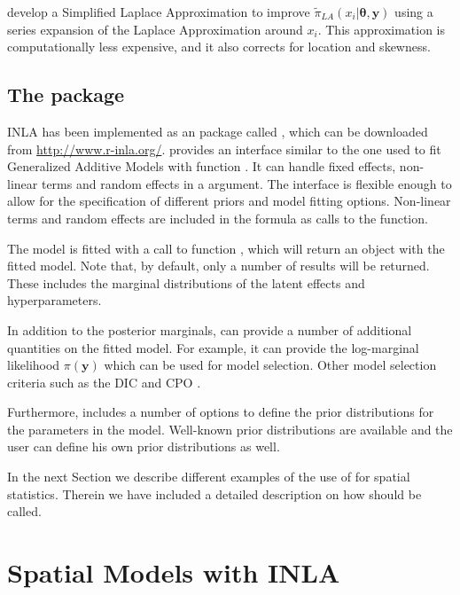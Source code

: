 \documentclass[article]{jss}
\begin{document}
\citet{isi:000264374200002} develop a Simplified Laplace Approximation to
improve $\tilde\pi_{LA}(x_i|\mathbf{\theta}, \mathbf{y})$ using a series
expansion of the Laplace Approximation around $x_i$. This approximation is
computationally less expensive, and it also corrects for location and
skewness.


\subsection[The R-INLA package]{The  package}

INLA has been implemented as an  package called ,
which can be downloaded from \url{http://www.r-inla.org/}. 
provides an interface similar to the one used to fit Generalized Additive
Models with function . It can handle fixed effects, non-linear terms
and random effects in a  argument. The interface is flexible
enough to allow for the specification of different priors and model fitting
options. Non-linear terms and random effects are included in the formula as
calls to the  function. 


The model is fitted with a call to function , which will return an
 object with the fitted model. Note that, by default, only a number
of results will be returned. These includes the marginal distributions of
the latent effects and hyperparameters. 


In addition to the posterior marginals,  can provide a number
of additional quantities on the fitted model. For example, it can 
provide the log-marginal likelihood $\pi(\mathbf{y})$ which can be used
for model selection. Other model selection criteria such as the DIC 
\citep{Spiegelhalteretal:2002} and CPO \citep{Heldetal:2010}.

Furthermore,  includes a number of options to define the
prior distributions for the parameters in the model. Well-known
prior distributions are available and the user can define his own prior
distributions as well.

In the next Section we describe different examples of the use of
 for spatial statistics. Therein we have included
a detailed description on how  should be called.

\section{Spatial Models with INLA} \label{sec:spmodels}
\end{document}
